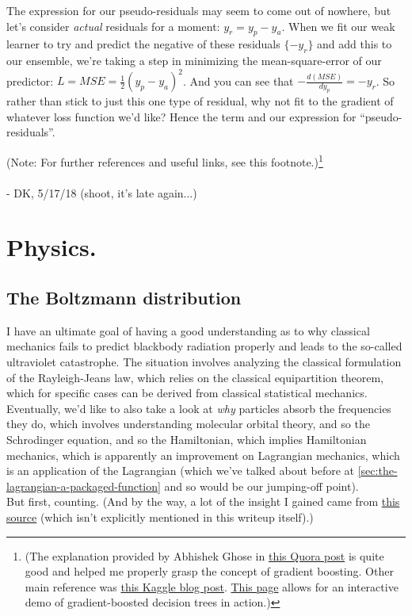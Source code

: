 \documentclass[letterpaper,12pt]{report}
\begin{document}
The expression for our pseudo-residuals may seem to come out of nowhere, but let's
consider \emph{actual} residuals for a moment: \(y_r = y_p - y_a\). When we fit
our weak learner to try and predict the negative of these residuals \(\{-y_r\}\) 
and add this to our ensemble, 
we're taking a step in minimizing the mean-square-error
of our predictor: \(L = MSE = \frac{1}{2} \left(y_p - y_a\right)^2\). And you can see that
\(- \frac{d(MSE)}{dy_p} = -y_r\). So rather than stick to just this one type of residual,
why not fit to the gradient of whatever loss function we'd like? 
Hence the term and our expression for ``pseudo-residuals''.

(Note: For further references and useful links, see this footnote.)\footnote{
(The explanation provided by Abhishek Ghose in \href{https://www.quora.com/What-is-an-intuitive-explanation-of-Gradient-Boosting}
{this Quora post} is quite good and helped me properly grasp
the concept of gradient boosting. Other main reference was
\href{http://blog.kaggle.com/2017/01/23/a-kaggle-master-explains-gradient-boosting/}
{this Kaggle blog post}. \href{http://arogozhnikov.github.io/2016/07/05/gradient_boosting_playground.html}
{This page} allows for an interactive demo of gradient-boosted decision trees in action.)
}
\\
\\
- DK, 5/17/18 (shoot, it's late again...)

\chapter{Physics.}\label{chapter:physics}



\section{The Boltzmann distribution}



I have an ultimate goal of having a good understanding as to why classical mechanics
fails to predict blackbody radiation properly and leads to the so-called ultraviolet
catastrophe. The situation involves analyzing the classical formulation of the
Rayleigh-Jeans law, which relies on the classical equipartition theorem, which for specific
cases can be derived from classical statistical mechanics.
\\
Eventually, we'd like to also take a look at \emph{why} particles absorb the frequencies
they do, which involves understanding molecular orbital theory, and so the Schrodinger equation,
and so the Hamiltonian, which implies Hamiltonian mechanics, which is apparently an improvement
on Lagrangian mechanics, which is an application of the Lagrangian (which 
we've talked about before at
\ref{sec:the-lagrangian-a-packaged-function}
and so would be our
jumping-off point).
\\
But first, counting. (And by the way, a lot of the insight I gained came from
\href{https://courses.physics.ucsd.edu/2017/Spring/physics4e/boltzmann.pdf}
{this source} (which isn't explicitly mentioned in this writeup itself).)
\end{document}
